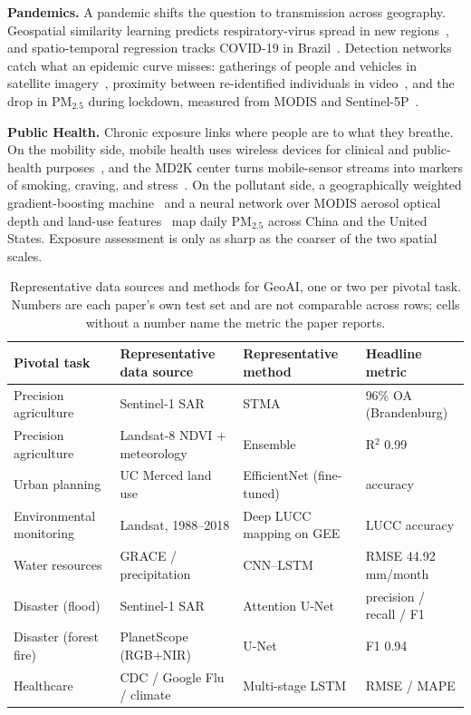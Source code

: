 \textbf{Pandemics.} A pandemic shifts the question to transmission across geography.
Geospatial similarity learning predicts respiratory-virus spread in new regions~\cite{ZhaoHJCWWYR23}, and spatio-temporal regression tracks COVID-19 in Brazil~\cite{da2021covid}.
Detection networks catch what an epidemic curve misses: gatherings of people and vehicles in satellite imagery~\cite{atek2022geospatial}, proximity between re-identified individuals in video~\cite{ZhangLCZJ23}, and the drop in PM$_{2.5}$ during lockdown, measured from MODIS and Sentinel-5P~\cite{TanLGJ22}.

\textbf{Public Health.} Chronic exposure links where people are to what they breathe.
On the mobility side, mobile health uses wireless devices for clinical and public-health purposes~\cite{kahn2010mobile}, and the MD2K center turns mobile-sensor streams into markers of smoking, craving, and stress~\cite{KumarAAaBCCCEEG15}.
On the pollutant side, a geographically weighted gradient-boosting machine~\cite{zhan2017spatiotemporal} and a neural network over MODIS aerosol optical depth and land-use features~\cite{di2016assessing} map daily PM$_{2.5}$ across China and the United States.
Exposure assessment is only as sharp as the coarser of the two spatial scales.

\begin{table}[!th]
\centering
\fontsize{8}{10}\selectfont
\setlength{\tabcolsep}{1.0mm}
\caption{Representative data sources and methods for GeoAI, one or two per pivotal task. Numbers are each paper's own test set and are not comparable across rows; cells without a number name the metric the paper reports.}
\label{tab:p4_s11_2_benchmarks}
\begin{tabular}{L{0.20\textwidth} L{0.24\textwidth} L{0.28\textwidth} L{0.20\textwidth}}
\toprule
\textbf{Pivotal task} & \textbf{Representative data source} & \textbf{Representative method} & \textbf{Headline metric} \\
\midrule
Precision agriculture & Sentinel-1 SAR & STMA~\cite{han2023spatio} & 96\% OA (Brandenburg) \\
Precision agriculture & Landsat-8 NDVI + meteorology & Ensemble~\cite{ramzan2023multimodal} & R$^2$ 0.99 \\
Urban planning & UC Merced land use & EfficientNet (fine-tuned)~\cite{AlemK22} & accuracy \\
Environmental monitoring & Landsat, 1988--2018 & Deep LUCC mapping on GEE~\cite{lou2023deep} & LUCC accuracy \\
Water resources & GRACE / precipitation & CNN--LSTM~\cite{seo2021predicting} & RMSE 44.92\,mm/month \\
Disaster (flood) & Sentinel-1 SAR & Attention U-Net~\cite{LiWCWJG22} & precision / recall / F1 \\
Disaster (forest fire) & PlanetScope (RGB+NIR) & U-Net~\cite{ChoPKKLS23} & F1 0.94 \\
Healthcare & CDC / Google Flu / climate & Multi-stage LSTM~\cite{DBLP:journals/access/VennaTGRMN19} & RMSE / MAPE \\
\bottomrule
\end{tabular}
\end{table}

